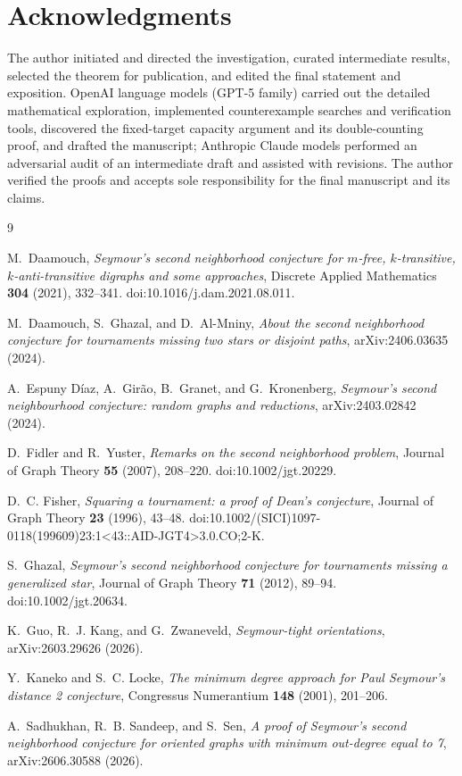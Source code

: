 \documentclass[12pt]{article}
\theoremstyle{plainsl}
\theoremstyle{remark}
\begin{document}
\section*{Acknowledgments}

The author initiated and directed the investigation, curated intermediate
results, selected the theorem for publication, and edited the final statement
and exposition.  OpenAI language models (GPT-5 family) carried out the
detailed mathematical exploration, implemented counterexample searches and
verification tools, discovered the fixed-target capacity argument and its
double-counting proof, and drafted the manuscript; Anthropic Claude models
performed an adversarial audit of an intermediate draft and assisted with
revisions.  The author verified
the proofs and accepts sole responsibility for the final manuscript and its
claims.

\begin{thebibliography}{9}

M.~Daamouch,
\emph{Seymour's second neighborhood conjecture for $m$-free, $k$-transitive,
$k$-anti-transitive digraphs and some approaches},
Discrete Applied Mathematics \textbf{304} (2021), 332--341.
doi:10.1016/j.dam.2021.08.011.

M.~Daamouch, S.~Ghazal, and D.~Al-Mniny,
\emph{About the second neighborhood conjecture for tournaments missing two
stars or disjoint paths},
arXiv:2406.03635 (2024).

A.~Espuny D\'iaz, A.~Gir\~ao, B.~Granet, and G.~Kronenberg,
\emph{Seymour's second neighbourhood conjecture: random graphs and reductions},
arXiv:2403.02842 (2024).

D.~Fidler and R.~Yuster,
\emph{Remarks on the second neighborhood problem},
Journal of Graph Theory \textbf{55} (2007), 208--220.
doi:10.1002/jgt.20229.

D.~C. Fisher,
\emph{Squaring a tournament: a proof of Dean's conjecture},
Journal of Graph Theory \textbf{23} (1996), 43--48.
doi:10.1002/(SICI)1097-0118(199609)23:1<43::AID-JGT4>3.0.CO;2-K.

S.~Ghazal,
\emph{Seymour's second neighborhood conjecture for tournaments missing a
generalized star},
Journal of Graph Theory \textbf{71} (2012), 89--94.
doi:10.1002/jgt.20634.

K.~Guo, R.~J. Kang, and G.~Zwaneveld,
\emph{Seymour-tight orientations},
arXiv:2603.29626 (2026).

Y.~Kaneko and S.~C. Locke,
\emph{The minimum degree approach for Paul Seymour's distance 2 conjecture},
Congressus Numerantium \textbf{148} (2001), 201--206.

A.~Sadhukhan, R.~B. Sandeep, and S.~Sen,
\emph{A proof of Seymour's second neighborhood conjecture for oriented graphs
with minimum out-degree equal to 7},
arXiv:2606.30588 (2026).

\end{thebibliography}
\end{document}
